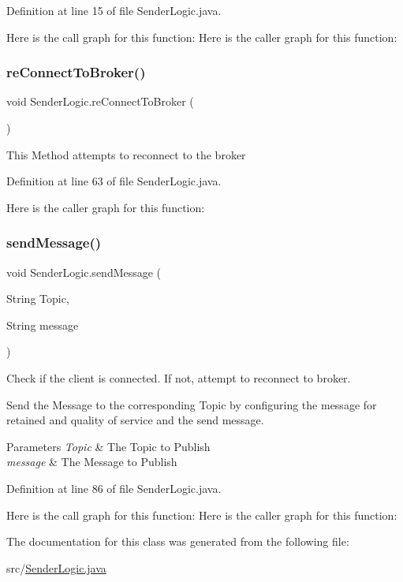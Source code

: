 Definition at line 15 of file Sender\+Logic.\+java.

Here is the call graph for this function\+:
Here is the caller graph for this function\+:
\mbox{\label{class_sender_logic_a8e4dbcdb4fe1fe4c2b381f06b6fdb2b7}} 
\subsubsection{\texorpdfstring{re\+Connect\+To\+Broker()}{reConnectToBroker()}}
{\footnotesize\ttfamily void Sender\+Logic.\+re\+Connect\+To\+Broker (\begin{DoxyParamCaption}{ }\end{DoxyParamCaption})}

This Method attempts to reconnect to the broker 

Definition at line 63 of file Sender\+Logic.\+java.

Here is the caller graph for this function\+:
\mbox{\label{class_sender_logic_a005680db1e66a7a994e5f30ee79b1bca}} 
\subsubsection{\texorpdfstring{send\+Message()}{sendMessage()}}
{\footnotesize\ttfamily void Sender\+Logic.\+send\+Message (\begin{DoxyParamCaption}\item[{String}]{Topic,  }\item[{String}]{message }\end{DoxyParamCaption})}

Check if the client is connected. If not, attempt to reconnect to broker.

Send the Message to the corresponding Topic by configuring the message for retained and quality of service and the send message.


\begin{DoxyParams}{Parameters}
{\em Topic} & The Topic to Publish \\
\hline
{\em message} & The Message to Publish \\
\hline
\end{DoxyParams}


Definition at line 86 of file Sender\+Logic.\+java.

Here is the call graph for this function\+:
Here is the caller graph for this function\+:


The documentation for this class was generated from the following file\+:\begin{DoxyCompactItemize}
\item 
src/\hyperlink{_sender_logic_8java}{Sender\+Logic.\+java}\end{DoxyCompactItemize}
